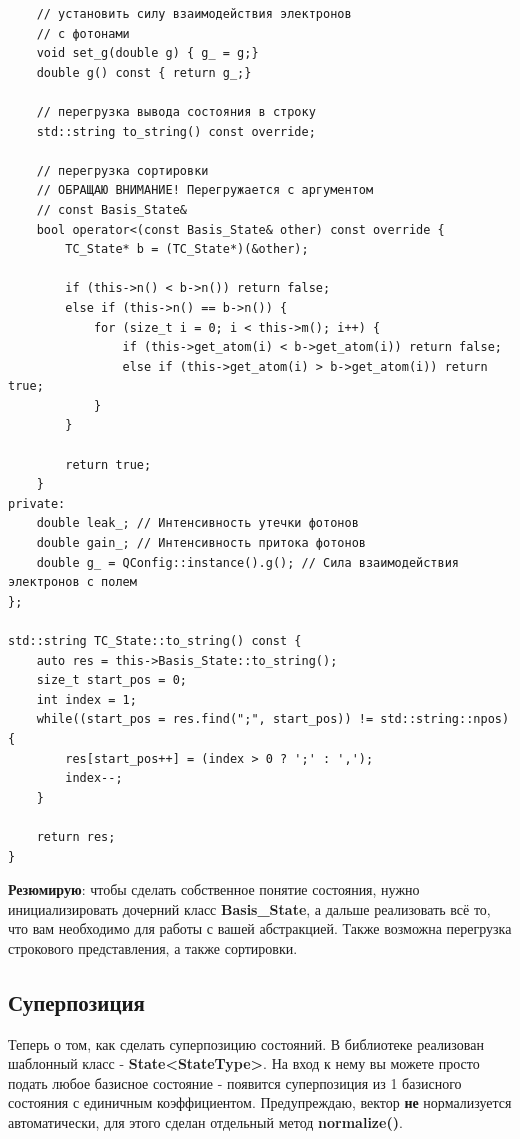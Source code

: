 \documentclass[12pt,fleqn]{article}
\begin{document}
\begin{mdframed}[linecolor=black, topline=true, bottomline=true,
leftline=false, rightline=false]
\begin{verbatim}
    // установить силу взаимодействия электронов
    // с фотонами
    void set_g(double g) { g_ = g;}
    double g() const { return g_;}

    // перегрузка вывода состояния в строку
    std::string to_string() const override;

    // перегрузка сортировки
    // ОБРАЩАЮ ВНИМАНИЕ! Перегружается с аргументом 
    // const Basis_State&
    bool operator<(const Basis_State& other) const override {
        TC_State* b = (TC_State*)(&other);

        if (this->n() < b->n()) return false;
        else if (this->n() == b->n()) {
            for (size_t i = 0; i < this->m(); i++) {
                if (this->get_atom(i) < b->get_atom(i)) return false;
                else if (this->get_atom(i) > b->get_atom(i)) return true;
            }
        }

        return true;
    }
private:
    double leak_; // Интенсивность утечки фотонов
    double gain_; // Интенсивность притока фотонов
    double g_ = QConfig::instance().g(); // Сила взаимодействия электронов с полем
};

std::string TC_State::to_string() const {
    auto res = this->Basis_State::to_string();
    size_t start_pos = 0;
    int index = 1;
    while((start_pos = res.find(";", start_pos)) != std::string::npos) {
        res[start_pos++] = (index > 0 ? ';' : ',');
        index--;
    }

    return res;
}

\end{verbatim}
\end{mdframed}

        \textbf{Резюмирую}: чтобы сделать собственное понятие состояния, нужно инициализировать дочерний класс \textbf{Basis\_State},
        а дальше реализовать всё то, что вам необходимо для работы с вашей абстракцией. Также возможна перегрузка строкового представления, а также сортировки.

        \subsection{Суперпозиция}

        Теперь о том, как сделать суперпозицию состояний. В библиотеке реализован шаблонный класс - \textbf{State<StateType>}. На вход к нему вы можете просто подать любое базисное состояние - появится 
        суперпозиция из 1 базисного состояния с единичным коэффициентом. Предупреждаю, вектор \textbf{не} нормализуется автоматически, для этого сделан отдельный метод \textbf{normalize()}.
\end{document}
